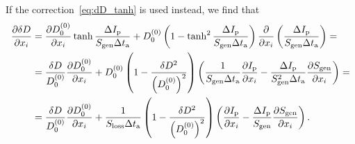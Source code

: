 \documentclass{notes}
\begin{document}
	If the correction~\eqref{eq:dD_tanh} is used instead, we find that
	\begin{equation}
		\begin{aligned}
			\frac{\partial\delta D}{\partial x_i} &=
				\frac{\partial D_0^{(0)}}{\partial x_i}\tanh\frac{\Delta I_{\rm p}}{S_{\rm gen}\Delta t_{\rm a}} +
				D_0^{(0)}\left(1-\tanh^2\frac{\Delta I_{\rm p}}{S_{\rm gen}\Delta t_{\rm a}}\right)
				\frac{\partial}{\partial x_i}\left(
					\frac{\Delta I_{\rm p}}{S_{\rm gen}\Delta t_{\rm a}}
				\right) =\\
			&= \frac{\delta D}{D_0^{(0)}}\frac{\partial D_0^{(0)}}{\partial x_i} +
			D_0^{(0)}\left(1-\frac{\delta D^2}{\left(D_0^{(0)}\right)^2}\right)
			\left(
				\frac{1}{S_{\rm gen}\Delta t_{\rm a}}\frac{\partial I_{\rm p}}{\partial x_i} -
				\frac{\Delta I_{\rm p}}{S_{\rm gen}^2\Delta t_{\rm a}}\frac{\partial S_{\rm gen}}{\partial x_i}
			\right) =\\
			&= \frac{\delta D}{D_0^{(0)}}\frac{\partial D_0^{(0)}}{\partial x_i} +
			\frac{1}{S_{\rm loss}\Delta t_{\rm a}}\left(
				1-\frac{\delta D^2}{\left(D_0^{(0)}\right)^2}
			\right)\left(
				\frac{\partial I_{\rm p}}{\partial x_i} - 
				\frac{\Delta I_{\rm p}}{S_{\rm gen}}
				\frac{\partial S_{\rm gen}}{\partial x_i}
			\right).
		\end{aligned}
	\end{equation}

	\appendix
\end{document}
